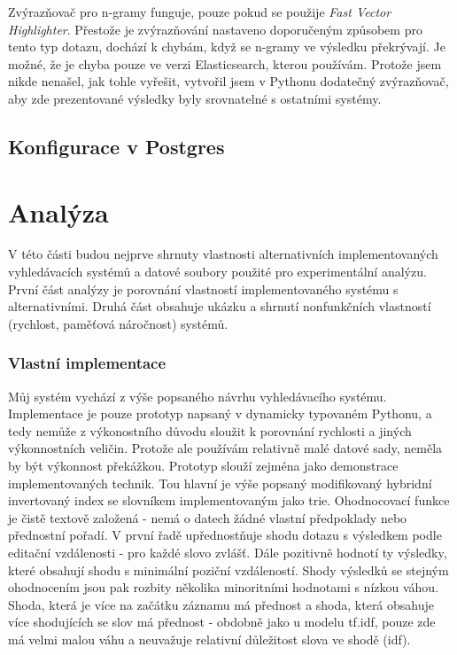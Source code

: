 \documentclass[11pt,letterpaper,oneside,openright]{book}
\begin{document}
Zvýrazňovač pro n-gramy funguje, pouze pokud se použije \textit{Fast Vector
Highlighter}. Přestože je zvýrazňování nastaveno doporučeným způsobem pro tento
typ dotazu, dochází k chybám, když se n-gramy ve výsledku překrývají. Je možné,
že je chyba pouze ve verzi Elasticsearch, kterou používám. Protože jsem nikde
nenašel, jak tohle vyřešit, vytvořil jsem v Pythonu dodatečný zvýrazňovač, aby
zde prezentované výsledky byly srovnatelné s ostatními systémy.

\section{Konfigurace v Postgres}


\chapter{Analýza}
V této části budou nejprve shrnuty vlastnosti alternativních implementovaných
vyhledávacích systémů a datové soubory použité pro experimentální analýzu.
První část analýzy je porovnání vlastností implementovaného systému s
alternativními. Druhá část obsahuje ukázku a shrnutí nonfunkčních vlastností
(rychlost, paměťová náročnost) systémů.


\subsection{Vlastní implementace}
Můj systém vychází z výše popsaného návrhu vyhledávacího systému. Implementace
je pouze prototyp napsaný v dynamicky typovaném Pythonu, a tedy nemůže z
výkonostního důvodu sloužit k porovnání rychlosti a jiných výkonnostních
veličin. Protože ale používám relativně malé datové sady, neměla by být
výkonnost překážkou. Prototyp slouží zejména jako demonstrace implementovaných
technik. Tou hlavní je výše popsaný modifikovaný hybridní invertovaný index se
slovníkem implementovaným jako trie.  Ohodnocovací funkce je čistě textově
založená - nemá o datech žádné vlastní předpoklady nebo přednostní pořadí. V
první řadě upřednostňuje shodu dotazu s výsledkem podle editační vzdálenosti -
pro každé slovo zvlášť. Dále pozitivně hodnotí ty výsledky, které obsahují
shodu s minimální poziční vzdáleností.  Shody výsledků se stejným ohodnocením
jsou pak rozbity několika minoritními hodnotami s nízkou váhou. Shoda, která je
více na začátku záznamu má přednost a shoda, která obsahuje více shodujících se
slov má přednost - obdobně jako u modelu tf.idf, pouze zde má velmi malou váhu
a neuvažuje relativní důležitost slova ve shodě (idf).
\end{document}
